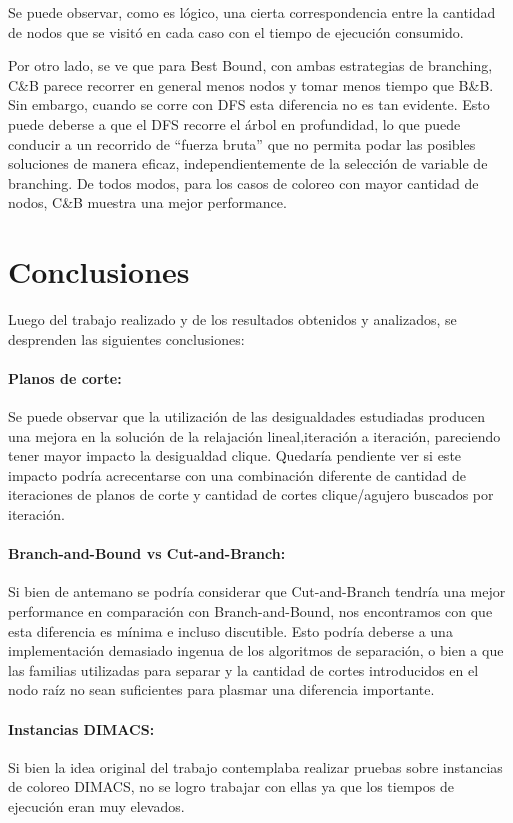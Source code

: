 \documentclass[a4paper]{article}
\begin{document}
\newpage

Se puede observar, como es lógico, una cierta correspondencia entre la cantidad de nodos que se visitó en cada caso con el tiempo de ejecución consumido. 

Por otro lado, se ve que para Best Bound, con ambas estrategias de branching, C\&B parece recorrer en general menos nodos y tomar menos tiempo que B\&B. Sin embargo, cuando se corre con DFS esta diferencia no es tan evidente. Esto puede deberse a que el DFS recorre el árbol en profundidad, lo que puede conducir a un recorrido de ``fuerza bruta'' que no permita podar las posibles soluciones de manera eficaz, independientemente de la selección de variable de branching. De todos modos, para los casos de coloreo con mayor cantidad de nodos, C\&B muestra una mejor performance.

\newpage

\section{Conclusiones}

Luego del trabajo realizado y de los resultados obtenidos y analizados, se desprenden las siguientes conclusiones:

\paragraph{Planos de corte:} Se puede observar que la utilización de las desigualdades estudiadas producen una mejora en la solución de la relajación lineal,iteración a iteración, pareciendo tener mayor impacto la desigualdad clique. Quedaría pendiente ver si este impacto podría acrecentarse con una combinación diferente de cantidad de iteraciones de planos de corte y cantidad de cortes clique/agujero buscados por iteración. 

\paragraph{Branch-and-Bound vs Cut-and-Branch:} Si bien de antemano se podría considerar que Cut-and-Branch tendría una mejor performance en comparación con Branch-and-Bound, nos encontramos con que esta diferencia es mínima e incluso discutible. Esto podría deberse a una implementación demasiado ingenua de los algoritmos de separación, o bien a que las familias utilizadas para separar y la cantidad de cortes introducidos en el nodo raíz no sean suficientes para plasmar una diferencia importante.

\paragraph{Instancias DIMACS:} Si bien la idea original del trabajo contemplaba realizar pruebas sobre instancias de coloreo DIMACS, no se logro trabajar con ellas ya que los tiempos de ejecución eran muy elevados.
\end{document}
